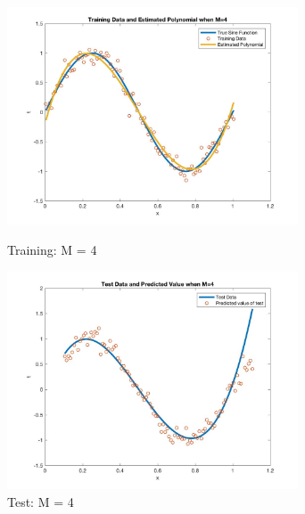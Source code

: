 \documentclass[a4paper]{article}
\begin{document}
\begin{spacing}{2.0}
	\begin{figure}[H]
	    \begin{minipage}[t]{0.5\textwidth}
	        \centering
	        \includegraphics[width=3.4in]{4train.jpeg}
	        \caption{Training: M = 4}
	        \label{fig:side:a}
	    \end{minipage}
	  \begin{minipage}[t]{0.5\textwidth}
	      \centering
	      \includegraphics[width=3.4in]{4test.jpeg}
	      \caption{Test: M = 4}
	      \label{fig:side:b}
	    \end{minipage}
	\end{figure}	
	

\end{spacing}
\end{document}
